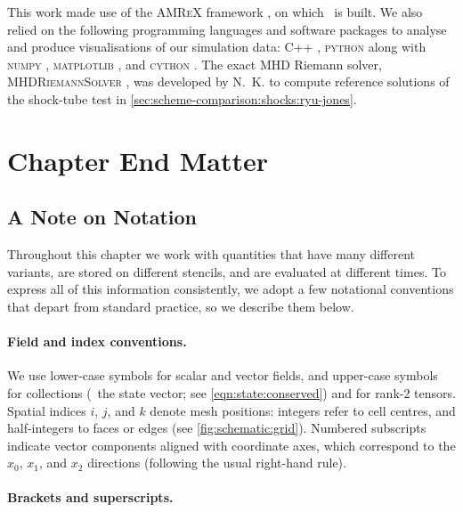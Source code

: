 This work made use of the \textsc{AMReX} framework \citep{Zhang19b}, on which \quokka~is built. We also relied on the following programming languages and software packages to analyse and produce visualisations of our simulation data: \textsc{C++} \citep{stroustrup2013cpp}, \textsc{python} along with \textsc{numpy} \citep{oliphant2006guide, van2011numpy, harris2020array}, \textsc{matplotlib} \citep{hunter2007matplotlib, bisong2019matplotlib}, and \textsc{cython} \citep{behnel2010cython, smith2015cython}. The exact MHD Riemann solver, \textsc{MHDRiemannSolver} \citep{Kriel26a}, was developed by N.~K. to compute reference solutions of the shock-tube test in \cref{sec:scheme-comparison:shocks:ryu-jones}.

\section{Chapter End Matter}

\subsection{A Note on Notation}
\label{sec:notation}

Throughout this chapter we work with quantities that have many different variants, are stored on different stencils, and are evaluated at different times. To express all of this information consistently, we adopt a few notational conventions that depart from standard practice, so we describe them below.

\paragraph*{Field and index conventions.}

We use lower-case symbols for scalar and vector fields, and upper-case symbols for collections (\eg~the state vector; see \cref{eqn:state:conserved}) and for rank-2 tensors. Spatial indices $i$, $j$, and $k$ denote mesh positions: integers refer to cell centres, and half-integers to faces or edges (see \cref{fig:schematic:grid}). Numbered subscripts indicate vector components aligned with coordinate axes, which correspond to the $x_0$, $x_1$, and $x_2$ directions (following the usual right-hand rule).

\paragraph*{Brackets and superscripts.}

